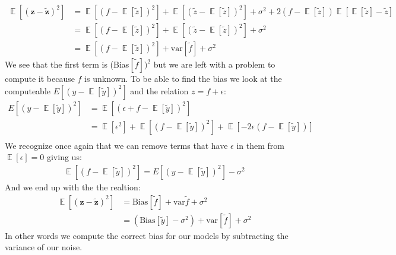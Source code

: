\documentclass[12pt]{article}
\DeclareMathOperator*{\E}{\mathbb{E}}
\begin{document}
\begin{align*}
  \E[(\boldsymbol{z}- \boldsymbol{\tilde{z}})^2] &=\E[(f -\E[\tilde{z}])^2] +\E[( \tilde{z} -\E[\tilde{z}])^2]  + \sigma^2+ 2(f-\E[\tilde{z}])\E[\E[\tilde{z}] -\tilde{z}]\\
  &=\E[(f -\E[\tilde{z}])^2]  + \E[( \tilde{z} -\E[\tilde{z}])^2]+\sigma^2\\
  &= \E[(f -\E[\tilde{z}])^2]  + \text{var}[\tilde{f}] + \sigma^2
\end{align*}
We see that the first term is (Bias$[\tilde{f}])^2$ but we are left with a problem to compute it because $f$ is unknown. To be able to find the bias we look at the computeable $E[(y - \E[\tilde{y}])^2]$ and the relation $z= f + \epsilon$:
\begin{align*}
  E[(y - \E[\tilde{y}])^2] &= \E[(\epsilon + f - \E[\tilde{y}])^2] \\
                           &= \E[\epsilon^2] + \E[(f- \E[\tilde{y}])^2] + \E[-2\epsilon(f- \E[\tilde{y}])] \\
\end{align*}
We recognize once again that we can remove terms that have $\epsilon$ in them from $\E[\epsilon] = 0$ giving us:
\begin{align*}
  \E[(f- \E[\tilde{y}])^2] =   E[(y - \E[\tilde{y}])^2] - \sigma^2
\end{align*}
And we end up with the the realtion:
\begin{align*}
  \E[(\boldsymbol{z}- \boldsymbol{\tilde{z}})^2] &= \text{Bias}[\tilde{f}] + \text{var}{\tilde{f}} + \sigma^2\\
   &=   (\text{Bias}[\tilde{y}] - \sigma^2) + \text{var}[\tilde{f}] + \sigma^2
\end{align*}
In other words we compute the correct bias for our models by subtracting the variance of our noise.
\end{document}
